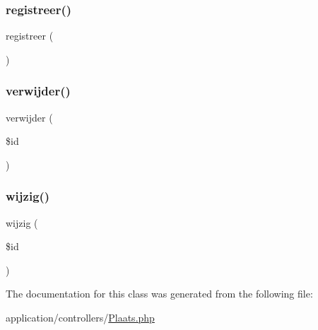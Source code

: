 \mbox{\label{class_plaats_a6db5689af94fb09c1652e5f3b1d2770a}} 
\subsubsection{\texorpdfstring{registreer()}{registreer()}}
{\footnotesize\ttfamily registreer (\begin{DoxyParamCaption}{ }\end{DoxyParamCaption})}

\mbox{\label{class_plaats_aa5997c2d1474e374ea50a87e8673d2e4}} 
\subsubsection{\texorpdfstring{verwijder()}{verwijder()}}
{\footnotesize\ttfamily verwijder (\begin{DoxyParamCaption}\item[{}]{\$id }\end{DoxyParamCaption})}

\mbox{\label{class_plaats_aa10f6589c4f171a54524ed6758bed97f}} 
\subsubsection{\texorpdfstring{wijzig()}{wijzig()}}
{\footnotesize\ttfamily wijzig (\begin{DoxyParamCaption}\item[{}]{\$id }\end{DoxyParamCaption})}



The documentation for this class was generated from the following file\+:\begin{DoxyCompactItemize}
\item 
application/controllers/\mbox{\hyperlink{_plaats_8php}{Plaats.\+php}}\end{DoxyCompactItemize}
